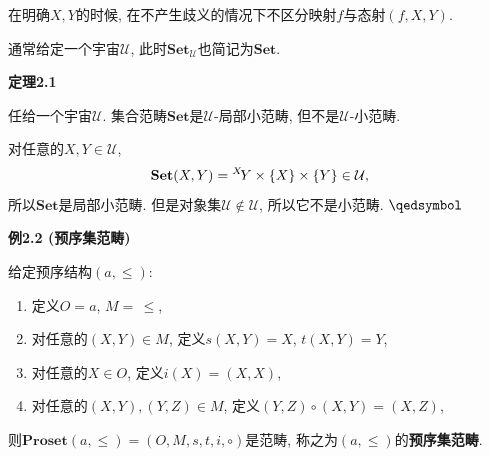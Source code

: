 \documentclass[UTF8]{ctexart}
\begin{document}
在明确$X,Y$的时候, 在不产生歧义的情况下不区分映射$f$与态射$(f,X,Y)$.

\vspace{10pt}

通常给定一个宇宙$\mathcal{U}$,
此时$\mathbf{Set}_{\mathcal{U}}$也简记为$\mathbf{Set}$.

\vspace{10pt}

\hypertarget{sec:定理2.1}{}
\noindent\textbf{定理2.1}

任给一个宇宙$\mathcal{U}$.
集合范畴$\mathbf{Set}$是$\mathcal{U}$-局部小范畴, 但不是$\mathcal{U}$-小范畴.


对任意的$X,Y\in\mathcal{U}$,
\vspace{-3pt}
\[
    \mathbf{Set}(X,Y)=\,\!^X\!Y\times\{X\}\times\{Y\}\in\mathcal{U},\\[-3pt]
\]
所以$\mathbf{Set}$是局部小范畴.
但是对象集$\mathcal{U}\notin\mathcal{U}$, 所以它不是小范畴. {\hfill $\qedsymbol$}

\vspace{10pt}

\hypertarget{sec:例2.2}{}
\noindent\textbf{例2.2 (预序集范畴)}

给定预序结构$(a,\leqslant)$:
\begin{enumerate}
    \item 定义$O=a$, $M=\,\leqslant$,
    \item 对任意的$(X,Y)\in M$, 定义$s(X,Y)=X$, $t(X,Y)=Y$,
    \item 对任意的$X\in O$, 定义$i(X)=(X,X)$,
    \item 对任意的$(X,Y),(Y,Z)\in M$, 定义$(Y,Z)\circ(X,Y)=(X,Z)$,
\end{enumerate}
则$\mathbf{Proset}(a,\leqslant)=(O,M,s,t,i,\circ)$是范畴,
称之为$(a,\leqslant)$的\textbf{预序集范畴}.
\end{document}
